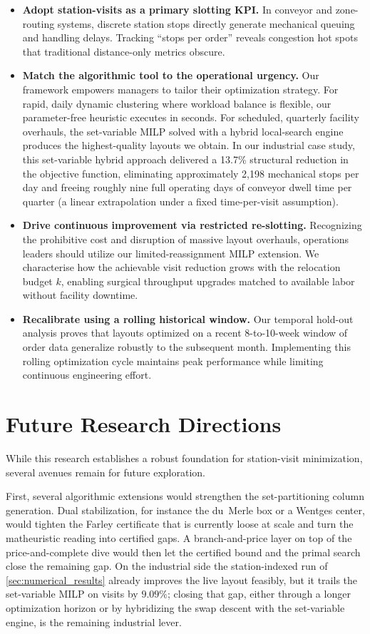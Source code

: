 \documentclass[preprint,review,11pt,authoryear]{elsarticle}
\begin{document}
\begin{itemize}
    \item \textbf{Adopt station-visits as a primary slotting KPI.} In conveyor and zone-routing systems, discrete station stops directly generate mechanical queuing and handling delays. Tracking ``stops per order'' reveals congestion hot spots that traditional distance-only metrics obscure.
    \item \textbf{Match the algorithmic tool to the operational urgency.} Our framework empowers managers to tailor their optimization strategy. For rapid, daily dynamic clustering where workload balance is flexible, our parameter-free heuristic executes in seconds. For scheduled, quarterly facility overhauls, the set-variable MILP solved with a hybrid local-search engine produces the highest-quality layouts we obtain. In our industrial case study, this set-variable hybrid approach delivered a 13.7\% structural reduction in the objective function, eliminating approximately 2,198 mechanical stops per day and freeing roughly nine full operating days of conveyor dwell time per quarter (a linear extrapolation under a fixed time-per-visit assumption).
    \item \textbf{Drive continuous improvement via restricted re-slotting.} Recognizing the prohibitive cost and disruption of massive layout overhauls, operations leaders should utilize our limited-reassignment MILP extension. We characterise how the achievable visit reduction grows with the relocation budget $k$, enabling surgical throughput upgrades matched to available labor without facility downtime.
    \item \textbf{Recalibrate using a rolling historical window.} Our temporal hold-out analysis proves that layouts optimized on a recent 8-to-10-week window of order data generalize robustly to the subsequent month. Implementing this rolling optimization cycle maintains peak performance while limiting continuous engineering effort.
\end{itemize}




\section {Future Research Directions}\label{sec:future}
While this research establishes a robust foundation for station-visit minimization, several avenues remain for future exploration. 

First, several algorithmic extensions would strengthen the set-partitioning column generation. Dual stabilization, for instance the du~Merle box or a Wentges center, would tighten the Farley certificate that is currently loose at scale and turn the matheuristic reading into certified gaps. A branch-and-price layer on top of the price-and-complete dive would then let the certified bound and the primal search close the remaining gap. On the industrial side the station-indexed run of \cref{sec:numerical_results} already improves the live layout feasibly, but it trails the set-variable MILP on visits by $9.09\%$; closing that gap, either through a longer optimization horizon or by hybridizing the swap descent with the set-variable engine, is the remaining industrial lever.
\end{document}
